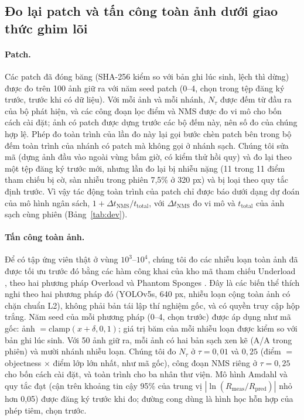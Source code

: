 \documentclass[a4paper,fleqn]{cas-dc}
\newcommand{\Ntau}{N_{\tau}}
\begin{document}
\subsection{Đo lại patch và tấn công toàn ảnh dưới giao thức ghim lõi}
\label{sec:attackdesign}
\paragraph{Patch.} Các patch đã đóng băng (SHA-256 kiểm so với bản ghi lúc sinh, lệch thì dừng) được đo trên 100 ảnh giữ ra với năm seed patch (0--4, chọn trong tệp đăng ký trước, trước khi có dữ liệu). Với mỗi ảnh và mỗi nhánh, $\Ntau$ được đếm từ đầu ra của bộ phát hiện, và các công đoạn lọc điểm và NMS được đo vi mô cho bốn cách cài đặt; ảnh có patch được dựng trước các bộ đếm này, nên số đo của chúng hợp lệ. Phép đo toàn trình của lần đo này lại gọi bước chèn patch bên trong bộ đếm toàn trình của nhánh có patch mà không gọi ở nhánh sạch. Chúng tôi sửa mã (dựng ảnh đầu vào ngoài vùng bấm giờ, có kiểm thử hồi quy) và đo lại theo một tệp đăng ký trước mới, nhưng lần đo lại bị nhiễu nặng (11 trong 11 điểm tham chiếu bị cờ, sàn nhiễu trong phiên 7,5\% ở 320 px) và bị loại theo quy tắc định trước. Vì vậy tác động toàn trình của patch chỉ được báo dưới dạng dự đoán của mô hình ngân sách, $1+\Delta t_{\mathrm{NMS}}/t_{\mathrm{total}}$, với $\Delta t_{\mathrm{NMS}}$ đo vi mô và $t_{\mathrm{total}}$ của ảnh sạch cùng phiên (Bảng~\ref{tab:dev}).

\paragraph{Tấn công toàn ảnh.} Để có tập ứng viên thật ở vùng $10^3$--$10^4$, chúng tôi đo các nhiễu loạn toàn ảnh đã được tối ưu trước đó bằng các hàm công khai của kho mã tham chiếu Underload \cite{underload2025}, theo hai phương pháp Overload \cite{overload2024} và Phantom Sponges \cite{phantom2023}. Đây là các biến thể thích nghi theo hai phương pháp đó (YOLOv5s, 640 px, nhiễu loạn cộng toàn ảnh có chặn chuẩn L2), không phải bản tái lập thí nghiệm gốc, và có quyền truy cập hộp trắng. Năm seed của mỗi phương pháp (0--4, chọn trước) được áp dụng như mã gốc: ảnh $=\mathrm{clamp}(x+\delta,0,1)$; giá trị băm của mỗi nhiễu loạn được kiểm so với bản ghi lúc sinh. Với 50 ảnh giữ ra, mỗi ảnh có hai bản sạch xen kẽ (A/A trong phiên) và mười nhánh nhiễu loạn. Chúng tôi đo $\Ntau$ ở $\tau=0{,}01$ và $0{,}25$ (điểm $=$ objectness $\times$ điểm lớp lớn nhất, như mã gốc), công đoạn NMS riêng ở $\tau=0{,}25$ cho bốn cách cài đặt, và toàn trình cho ba nhân thư viện. Mô hình Amdahl và quy tắc đạt (cận trên khoảng tin cậy 95\% của trung vị $|\ln(R_{\mathrm{meas}}/R_{\mathrm{pred}})|$ nhỏ hơn 0,05) được đăng ký trước khi đo; đường cong dùng là hình học hỗn hợp của phép tiêm, chọn trước.
\end{document}
